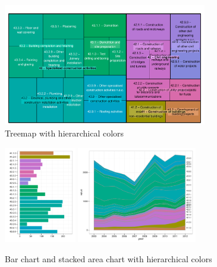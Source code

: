\documentclass[review]{vgtc}                 %
\begin{document}
\begin{figure}[htb]
  \centering
  \includegraphics[width=3.5in]{treemap_F.pdf}
  \caption{Treemap with hierarchical colors}\label{fig:treemapF}
\end{figure}



\begin{figure}[htb]
  \centering
  \includegraphics[width=1.235in]{bar_chart.pdf}
  \includegraphics[width=2.065in]{stackedarea_chart.pdf}
  \caption{Bar chart and stacked area chart with hierarchical colors}\label{fig:charts}
\end{figure}

\end{document}
